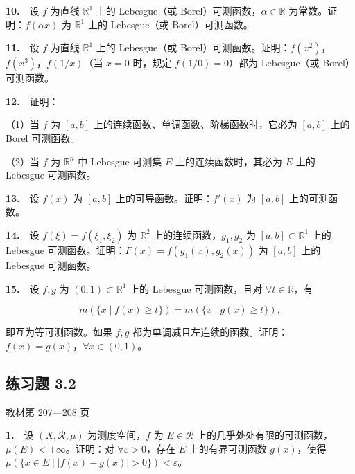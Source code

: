 \documentclass[11pt,a4paper]{article}
\begin{document}
\par{}\noindent \textbf{10.}　设 \(f\) 为直线 \(\mathbb R^1\) 上的 Lebesgue（或 Borel）可测函数，\(\alpha\in\mathbb R\) 为常数。证明：\(f(\alpha x)\) 为 \(\mathbb R^1\) 上的 Lebesgue（或 Borel）可测函数。

\par{}\noindent \textbf{11.}　设 \(f\) 为直线 \(\mathbb R^1\) 上的 Lebesgue（或 Borel）可测函数。证明：\(f(x^2)\)，\(f(x^3)\)，\(f(1/x)\)（当 \(x=0\) 时，规定 \(f(1/0)=0\)）都为 Lebesgue（或 Borel）可测函数。

\par{}\noindent \textbf{12.}　证明：

（1）当 \(f\) 为 \([a,b]\) 上的连续函数、单调函数、阶梯函数时，它必为 \([a,b]\) 上的 Borel 可测函数。

（2）当 \(f\) 为 \(\mathbb R^n\) 中 Lebesgue 可测集 \(E\) 上的连续函数时，其必为 \(E\) 上的 Lebesgue 可测函数。

\par{}\noindent \textbf{13.}　设 \(f(x)\) 为 \([a,b]\) 上的可导函数。证明：\(f'(x)\) 为 \([a,b]\) 上的可测函数。

\par{}\noindent \textbf{14.}　设 \(f(\xi)=f(\xi_1,\xi_2)\) 为 \(\mathbb R^2\) 上的连续函数，\(g_1,g_2\) 为 \([a,b]\subset\mathbb R^1\) 上的 Lebesgue 可测函数。证明：\(F(x)=f(g_1(x),g_2(x))\) 为 \([a,b]\) 上的 Lebesgue 可测函数。

\par{}\noindent \textbf{15.}　设 \(f,g\) 为 \((0,1)\subset\mathbb R^1\) 上的 Lebesgue 可测函数，且对 \(\forall t\in\mathbb R\)，有

\[
m(\{x\mid f(x)\ge t\})=m(\{x\mid g(x)\ge t\}),
\]

即互为等可测函数。如果 \(f,g\) 都为单调减且左连续的函数。证明：\(f(x)=g(x)\)，\(\forall x\in(0,1)\)。


\hypertarget{ex2}{}\subsection*{练习题 3.2}
\noindent 教材第 207—208 页

\par{}\noindent \textbf{1.}　设 \((X,\mathcal R,\mu)\) 为测度空间，\(f\) 为 \(E\in\mathcal R\) 上的几乎处处有限的可测函数，\(\mu(E)<+\infty\)。证明：对 \(\forall\varepsilon>0\)，存在 \(E\) 上的有界可测函数 \(g(x)\)，使得 \(\mu(\{x\in E\mid |f(x)-g(x)|>0\})<\varepsilon\)。
\end{document}
